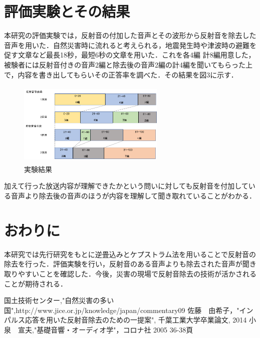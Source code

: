 \documentclass[twocolumn,10pt,a4j]{jsarticle}
\begin{document}
\section{評価実験とその結果}
本研究の評価実験では，反射音の付加した音声とその波形から反射音を除去した音声を用いた．自然災害時に流れると考えられる，地震発生時や津波時の避難を促す文章など最長18秒，最短6秒の文章を用いた．これを各4編
計8編用意した，被験者には反射音付きの音声2編と除去後の音声2編の計4編を聞いてもらった上で，内容を書き出してもらいその正答率を調べた．その結果を図3に示す．
\begin{figure}[h]
\begin{center}
 \includegraphics[clip,width=70mm,height=40mm]{shitsumon.pdf}
\end{center}
 \caption{実験結果}
 \label{fig:教科書}
\end{figure}
加えて行った放送内容が理解できたかという問いに対しても反射音を付加している音声より除去後の音声のほうが内容を理解して聞き取れていることがわかる．

\section{おわりに}


本研究では先行研究\cite{oka2}をもとに逆畳込みとケプストラム法を用いることで反射音の除去を行った．評価実験を行い，反射音のある音声よりも除去された音声が聞き取りやすいことを確認した．今後，災害の現場で反射音除去の技術が活かされることが期待される．
\begin{thebibliography}{99}
国土技術センター,"自然災害の多い国",http://www.jice.or.jp/knowledge/japan/commentary09
佐藤　由希子，"インパルス応答を用いた反射音除去のための一提案", 千葉工業大学卒業論文, 2014
小泉　宣夫,"基礎音響・オーディオ学"，コロナ社 2005 36-38頁

\end{thebibliography}
\end{document}
